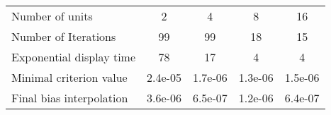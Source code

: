 \begin{tabular}{l|cccc}
Number of units & 2 & 4 & 8 & 16 \\
Number of Iterations & 99 & 99 & 18 & 15 \\
Exponential display time & 78 & 17 & 4 & 4 \\
Minimal criterion value & 2.4e-05 & 1.7e-06 & 1.3e-06 & 1.5e-06 \\
Final bias interpolation & 3.6e-06 & 6.5e-07 & 1.2e-06 & 6.4e-07 \\
\end{tabular}
